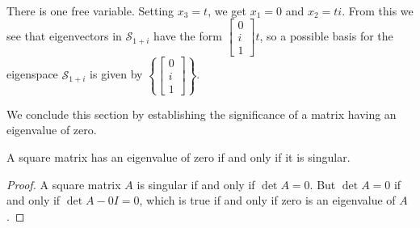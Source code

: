 \documentclass{ximera}
\begin{document}
\begin{example}
\begin{explanation}
\begin{align*}
\end{align*}
There is one free variable.  Setting $x_3=t$, we get $x_1=0$ and $x_2=ti$.  From this we see that eigenvectors in $\mathcal{S}_{1+i}$ have the form $\begin{bmatrix}0\\i\\1\end{bmatrix}t$, so a possible basis for the eigenspace $\mathcal{S}_{1+i}$ is given by $\left\{\begin{bmatrix}0\\i\\1\end{bmatrix}\right\}$.
\end{explanation}
\end{example}
    
We conclude this section by establishing the significance of a matrix having an eigenvalue of zero.
    
\begin{theorem}\label{th:zero_ew}
A square matrix has an eigenvalue of zero if and only if it is singular.
\end{theorem}
    
\begin{proof}
A square matrix $A$ is singular if and only if $\det{A}=0$.  But $\det{A}=0$ if and only if $\det{A-0I}=0$, which is true if and only if zero is an eigenvalue of $A$.
\end{proof}

    
\end{document}
